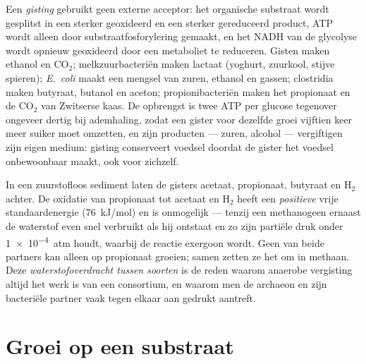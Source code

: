 \begin{definition}\label{def:b2:microbial-metabolism:fermentation}
Een \emph{gisting} gebruikt geen externe acceptor: het organische
substraat wordt gesplitst in een sterker geoxideerd en een sterker
gereduceerd product, ATP wordt alleen door substraatfosforylering
gemaakt, en het NADH van de glycolyse wordt opnieuw geoxideerd door een
metaboliet te reduceren. Gisten maken ethanol en $\mathrm{CO_2}$;
melkzuurbacteriën maken lactaat (yoghurt, zuurkool, stijve spieren);
\emph{E.~coli} maakt een mengsel van zuren, ethanol en gassen;
clostridia maken butyraat, butanol en aceton; propionibacteriën maken
het propionaat en de $\mathrm{CO_2}$ van Zwitserse kaas. De opbrengst is
twee ATP per glucose tegenover ongeveer dertig bij ademhaling, zodat
een gister voor dezelfde groei vijftien keer meer suiker moet omzetten,
en zijn producten --- zuren, alcohol --- vergiftigen zijn eigen medium:
gisting conserveert voedsel doordat de gister het voedsel onbewoonbaar
maakt, ook voor zichzelf.
\end{definition}

\begin{example}\label{ex:b2:microbial-metabolism:syntrophy}
In een zuurstofloos sediment laten de gisters acetaat, propionaat,
butyraat en $\mathrm{H_2}$ achter. De oxidatie van propionaat tot acetaat
en $\mathrm{H_2}$ heeft een \emph{positieve} vrije standaardenergie
(\qty{+76}{kJ/mol}) en is onmogelijk --- tenzij een methanogeen ernaast
de waterstof even snel verbruikt als hij ontstaat en zo zijn partiële
druk onder \qty{1e-4}{atm} houdt, waarbij de reactie exergoon wordt.
Geen van beide partners kan alleen op propionaat groeien; samen zetten
ze het om in methaan. Deze \emph{waterstofoverdracht tussen soorten} is
de reden waarom anaerobe vergisting altijd het werk is van een
consortium, en waarom men de archaeon en zijn bacteriële partner vaak
tegen elkaar aan gedrukt aantreft.
\end{example}

\section{Groei op een substraat}

